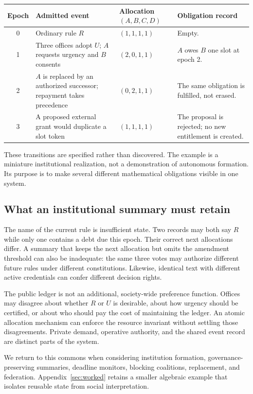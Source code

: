 \documentclass[11pt,letterpaper]{article}
\theoremstyle{plain}
\theoremstyle{definition}
\theoremstyle{remark}
\begin{document}
\begin{center}
\begin{tabularx}{\linewidth}{@{}cP{.25\linewidth}P{.19\linewidth}X@{}}
\toprule
Epoch & Admitted event & Allocation $(A,B,C,D)$ & Obligation record\\
 & Ordinary rule $R$ & $(1,1,1,1)$ & Empty.\\[.35em]
1 & Three offices adopt $U$; $A$ requests urgency and $B$ consents & $(2,0,1,1)$ & $A$ owes $B$ one slot at epoch 2.\\[.35em]
2 & $A$ is replaced by an authorized successor; repayment takes precedence & $(0,2,1,1)$ & The same obligation is fulfilled, not erased.\\[.35em]
3 & A proposed external grant would duplicate a slot token & $(1,1,1,1)$ & The proposal is rejected; no new entitlement is created.\\
\bottomrule
\end{tabularx}
\end{center}

These transitions are specified rather than discovered. The example is a miniature institutional realization, not a demonstration of autonomous formation. Its purpose is to make several different mathematical obligations visible in one system.

\subsection{What an institutional summary must retain}
The name of the current rule is insufficient state. Two records may both say $R$ while only one contains a debt due this epoch. Their correct next allocations differ. A summary that keeps the next allocation but omits the amendment threshold can also be inadequate: the same three votes may authorize different future rules under different constitutions. Likewise, identical text with different active credentials can confer different decision rights.

The public ledger is not an additional, society-wide preference function. Offices may disagree about whether $R$ or $U$ is desirable, about how urgency should be certified, or about who should pay the cost of maintaining the ledger. An atomic allocation mechanism can enforce the resource invariant without settling those disagreements. Private demand, operative authority, and the shared event record are distinct parts of the system.

We return to this commons when considering institution formation, governance-preserving summaries, deadline monitors, blocking coalitions, replacement, and federation. Appendix~\ref{sec:worked} retains a smaller algebraic example that isolates reusable state from social interpretation.
\end{document}
